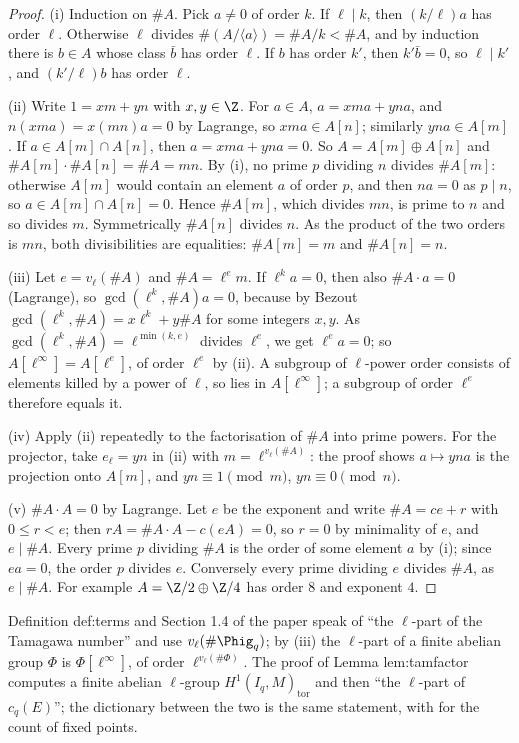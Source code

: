 \begin{proof}
(i) Induction on $\#A$. Pick $a\ne0$ of order $k$. If $\ell\mid k$, then $(k/\ell)a$ has order $\ell$. Otherwise $\ell$ divides
$\#(A/\langle a\rangle)=\#A/k<\#A$, and by induction there is $b\in A$ whose class $\bar b$ has order $\ell$. If $b$ has order $k'$, then
$k'\bar b=0$, so $\ell\mid k'$, and $(k'/\ell)b$ has order $\ell$.

(ii) Write $1=xm+yn$ with $x,y\in\Z$. For $a\in A$, $a=xma+yna$, and $n(xma)=x(mn)a=0$ by Lagrange, so $xma\in A[n]$; similarly $yna\in A[m]$.
If $a\in A[m]\cap A[n]$, then $a=xma+yna=0$. So $A=A[m]\oplus A[n]$ and $\#A[m]\cdot\#A[n]=\#A=mn$. By (i), no prime $p$ dividing $n$ divides
$\#A[m]$: otherwise $A[m]$ would contain an element $a$ of order $p$, and then $na=0$ as $p\mid n$, so $a\in A[m]\cap A[n]=0$. Hence $\#A[m]$, which divides
$mn$, is prime to $n$ and so divides $m$. Symmetrically $\#A[n]$ divides $n$. As the product of the two orders is $mn$, both divisibilities are equalities:
$\#A[m]=m$ and $\#A[n]=n$.

(iii) Let $e=v_\ell(\#A)$ and $\#A=\ell^em$. If $\ell^ka=0$, then also $\#A\cdot a=0$ (Lagrange), so $\gcd(\ell^k,\#A)a=0$, because by Bezout
$\gcd(\ell^k,\#A)=x\ell^k+y\#A$ for some integers $x,y$. As $\gcd(\ell^k,\#A)=\ell^{\min(k,e)}$ divides $\ell^e$, we get $\ell^ea=0$; so $A[\ell^\infty]=A[\ell^e]$, of
order $\ell^e$ by (ii). A subgroup of $\ell$-power order consists of elements killed by a power of $\ell$, so lies in $A[\ell^\infty]$; a
subgroup of order $\ell^e$ therefore equals it.

(iv) Apply (ii) repeatedly to the factorisation of $\#A$ into prime powers. For the projector, take $e_\ell=y n$ in (ii) with
$m=\ell^{v_\ell(\#A)}$: the proof shows $a\mapsto yna$ is the projection onto $A[m]$, and $yn\equiv1\pmod m$, $yn\equiv0\pmod n$.

(v) $\#A\cdot A=0$ by Lagrange. Let $e$ be the exponent and write $\#A=ce+r$ with $0\le r<e$; then $rA=\#A\cdot A-c(eA)=0$, so $r=0$ by minimality of
$e$, and $e\mid\#A$. Every prime $p$ dividing $\#A$ is the order of some element $a$ by (i); since $ea=0$, the order $p$ divides $e$. Conversely every prime
dividing $e$ divides $\#A$, as $e\mid\#A$. For example $A=\Z/2\oplus\Z/4$ has order $8$ and exponent $4$.
\end{proof}

\begin{paperlink}
Definition def:terms and Section 1.4 of the paper speak of ``the $\ell$-part of the Tamagawa number'' and use $v_\ell(\#\Phig_q)$; by
(iii) the $\ell$-part of a finite abelian group $\Phi$ is $\Phi[\ell^\infty]$, of order $\ell^{v_\ell(\#\Phi)}$. The proof
of Lemma lem:tamfactor computes a finite abelian $\ell$-group $H^1(I_q,M)_{\mathrm{tor}}$ and then ``the $\ell$-part of $c_q(E)$''; the
dictionary between the two is the same statement, with  for the count of fixed points.
\end{paperlink}

